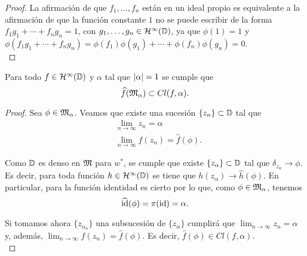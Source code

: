 \begin{proof}
La afirmación de que $f_1, \dots, f_n$ están en un ideal propio es equivalente a la afirmación de que la función constante $1$ no se puede escribir de la forma $f_1 g_1 + \cdots + f_n g_n = 1$, con $g_1, \dots, g_n \in \mathcal{H}^{\infty}(\mathbb{D})$, ya que $\phi (1) = 1$ y $\phi (f_1 g_1 + \cdots + f_n g_n) = \phi (f_1) \phi (g_1) + \cdots + \phi (f_n) \phi (g_n) = 0$. \\
\end{proof}


\begin{prop}
    Para todo $f \in \mathcal{H}^{\infty}(\mathbb{D})$ y $\alpha$ tal que $\left\lvert\alpha\right\rvert = 1$ se cumple que
    \begin{equation*}
        \widehat{f} (\mathfrak{M}_\alpha) \subset Cl(f, \alpha).
    \end{equation*}
\end{prop}

\begin{proof}
    Sea $\phi \in \mathfrak{M}_\alpha$. Veamos que existe una sucesión $\{ z_n\} \subset \mathbb{D}$ tal que
     \leqnomode
    \begin{align}
        & \lim_{n \rightarrow \infty} z_n = \alpha \\
        & \lim_{n \rightarrow \infty} f(z_n)= \widehat{f} (\phi).
    \end{align}

    Como $\mathbb{D}$ es denso en $\mathfrak{M}$ para $w^*$, se cumple que existe $\{z_\alpha\} \subset \mathbb{D}$ tal que $\delta_{z_\alpha} \rightarrow \phi$. Es decir, para toda función $h \in \mathcal{H}^{\infty}(\mathbb{D})$ se tiene que $h (z_\alpha) \rightarrow \widehat{h} (\phi)$. En particular, para la función identidad es cierto por lo que, como $\phi \in \mathfrak{M}_\alpha$, tenemos
    \begin{equation*}
        \widehat {\operatorname{id}}(\phi) = \pi(\operatorname{id}) = \alpha.
    \end{equation*}

    Si tomamos ahora $\{z_{\alpha_n}\}$ una subsucesión de $\{z_\alpha\}$ cumplirá que $\lim_{n \rightarrow \infty} z_n = \alpha$ y, además, $\lim_{n \rightarrow \infty} f(z_n)= \widehat{f} (\phi)$. Es decir, $\widehat{f} (\phi) \in Cl (f, \alpha)$. \\
\end{proof}

